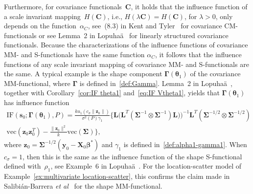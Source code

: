 \documentclass{article}
\numberwithin{equation}{section}
\theoremstyle{plain}
\newcommand{\vc}{\mathrm{vec}}
\newcommand{\bbeta}{\bm\beta}
\newcommand{\btheta}{\bm\theta}
\newcommand{\bSigma}{\mathbf{\Sigma}}
\newcommand{\bGamma}{\bm\Gamma}
\newcommand{\by}{\mathbf{y}}
\newcommand{\bs}{\mathbf{s}}
\newcommand{\bz}{\mathbf{z}}
\newcommand{\bX}{\mathbf{X}}
\newcommand{\bC}{\mathbf{C}}
\newcommand{\bL}{\mathbf{L}}
\begin{document}
Furthermore, for covariance functionals~$\bC$, it holds that
the influence function of a scale invariant mapping~$H(\bC)$,
i.e., $H(\lambda\bC)=H(\bC)$, for $\lambda>0$, only depends on the function~$\alpha_C$,
see~(8.3) in Kent and Tyler~\cite{kent&tyler1996} for covariance CM-functionals
or see Lemma~2 in Lopuha\"a~\cite{lopuhaa2025} for linearly structured covariance functionals.
Because the characterizations of the influence functions of covariance MM- and S-functionals have
the same function $\alpha_C$, it follows that the influence functions of any scale invariant mapping 
of covariance MM- and S-functionals are the same.
A typical example is the shape component $\bGamma(\btheta_1)$ of the covariance 
MM-functional, where $\bGamma$ is defined in~\eqref{def:Gamma}.
Lemma~2 in Lopuha\"a~\cite{lopuhaa2025}, together with Corollary~\ref{cor:IF theta1} and~\eqref{eq:IF Vtheta1},
yields that $\bGamma(\btheta_1)$ has influence function
\begin{equation}
\label{eq:IF Vgamma}
\begin{split}
\text{IF}(\bs_0;\bGamma(\btheta_1),P)
=
\frac{ku_1(c_\sigma\|\bz_0\|)}{\sigma^2(P)\gamma_1}
\bigg\{
\bL\Big(\bL^T(\bSigma^{-1}\otimes\bSigma^{-1})\bL)\Big)^{-1}
\bL^T
\left(\bSigma^{-1/2}\otimes\bSigma^{-1/2}\right)\\
\vc\left(\bz_0\bz_0^T\right)
-
\frac{\|\bz_0\|^2}{k}
\vc(\bSigma)
\bigg\},
\end{split}
\end{equation}
where $\bz_0=\bSigma^{-1/2}(\by_0-\bX_0\bbeta^*)$ 
and $\gamma_1$ is defined in~\eqref{def:alpha1-gamma1}.
When $c_\sigma=1$, then this is the same as the influence function of the shape S-functional defined with~$\rho_1$,
see Example~6 in Lopuha\"a~\cite{lopuhaa2025}.
For the location-scatter model of Example~\ref{ex:multivariate location-scatter},
this confirms the claim made in Salibi\'an-Barrera \emph{et al}~\cite{SalibianBarrera-VanAelst-Willems2006}
for the shape MM-functional.
\end{document}
